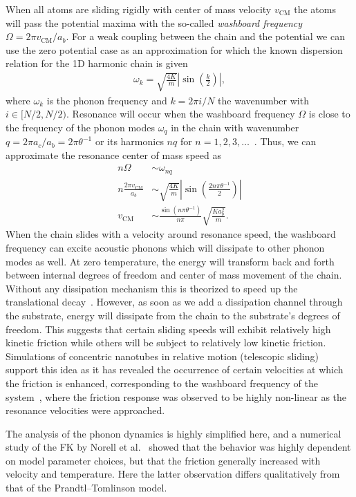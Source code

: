When all atoms are sliding rigidly with center of mass velocity $v_{{\text{CM}}}$ the atoms will pass the potential maxima with the so-called \textit{washboard frequency} $\Omega = 2\pi v_{{\text{CM}}} / a_b$. For a weak coupling between the chain and the potential we can use the zero potential case as an approximation for which the known dispersion relation for the 1D harmonic chain is given~\cite[p. 92]{Kittel2004}
\begin{align*}
  \omega_k = \sqrt{\frac{4 K}{m}} \left|\sin{\left(\frac{k}{2}\right)}\right|,
\end{align*}
where $\omega_k$ is the phonon frequency and $k = 2\pi i / N$ the wavenumber with $i\in [N/2, N/2)$. Resonance will occur when the washboard frequency $\Omega$ is close to the frequency of the phonon modes $\omega_q$ in the chain with wavenumber $q = 2\pi a_c / a_b = 2\pi \theta^{-1}$ or its harmonics $nq$ for $n = 1, 2, 3, \hdots$~\cite{van_den_Ende_2012}. Thus, we can approximate the resonance center of mass speed as
\begin{align*}
    n \Omega &\sim \omega_{nq} \\
    n \frac{2\pi v_{\text{CM}}}{a_b} &\sim \sqrt{\frac{4K}{m}} \left| \sin{\left(\frac{2n \pi \theta^{-1}}{2}\right)}\right| \\
    v_{\text{CM}} &\sim \frac{\sin{(n\pi \theta^{-1})}}{n \pi} \sqrt{\frac{Ka_b^2}{m}}.
\end{align*}
When the chain slides with a velocity around resonance speed, the washboard
frequency can excite acoustic phonons which will dissipate to other phonon modes
as well. At zero temperature, the energy will transform back and forth between
internal degrees of freedom and center of mass movement of the chain. Without any dissipation mechanism this is theorized to speed up the translational decay~\cite{FK2D}. However, as soon as we add a dissipation channel through the substrate, energy will dissipate from the chain to the substrate's degrees of freedom. This suggests that certain sliding speeds will exhibit relatively high kinetic friction while
others will be subject to relatively low kinetic friction. Simulations of
concentric nanotubes in relative motion (telescopic sliding) support this idea as it has revealed the
occurrence of certain velocities at which the friction is enhanced, corresponding
to the washboard frequency of the system~\cite{Manini_2016}, where the friction response was observed to be highly non-linear as the resonance velocities were
approached. 

The analysis of the phonon dynamics is highly simplified here, and a numerical study of the \acrshort{FK} by Norell et al.~\cite{FK2D} showed that the behavior was highly dependent on model parameter choices, but that the friction generally increased with velocity and temperature. Here the latter observation differs qualitatively from that of the Prandtl–Tomlinson model.



